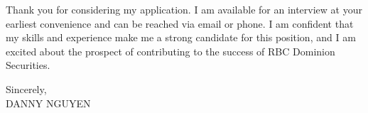 \documentclass[letterpaper,11pt]{article}
\begin{document}
\vspace{10pt}

Thank you for considering my application. I am available for an interview at your earliest convenience and can be reached via email or phone. I am confident that my skills and experience make me a strong candidate for this position, and I am excited about the prospect of contributing to the success of RBC Dominion Securities.

\vspace{20pt}

Sincerely, \\
\vspace{40pt}
DANNY NGUYEN
\end{document}

